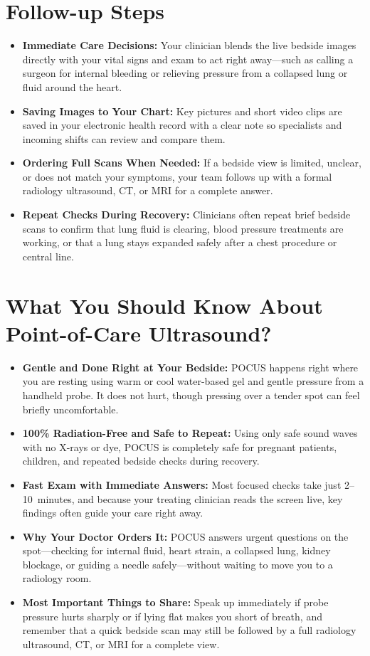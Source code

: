 \section{Follow-up Steps}

\begin{itemize}
    \item \textbf{Immediate Care Decisions:} Your clinician blends the live bedside images directly with your vital signs and exam to act right away---such as calling a surgeon for internal bleeding or relieving pressure from a collapsed lung or fluid around the heart.
    \item \textbf{Saving Images to Your Chart:} Key pictures and short video clips are saved in your electronic health record with a clear note so specialists and incoming shifts can review and compare them.
    \item \textbf{Ordering Full Scans When Needed:} If a bedside view is limited, unclear, or does not match your symptoms, your team follows up with a formal radiology ultrasound, CT, or MRI for a complete answer.
    \item \textbf{Repeat Checks During Recovery:} Clinicians often repeat brief bedside scans to confirm that lung fluid is clearing, blood pressure treatments are working, or that a lung stays expanded safely after a chest procedure or central line.
\end{itemize}

\section{What You Should Know About Point-of-Care Ultrasound?}

\begin{itemize}
    \item \textbf{Gentle and Done Right at Your Bedside:} POCUS happens right where you are resting using warm or cool water-based gel and gentle pressure from a handheld probe. It does not hurt, though pressing over a tender spot can feel briefly uncomfortable.
    \item \textbf{100\% Radiation-Free and Safe to Repeat:} Using only safe sound waves with no X-rays or dye, POCUS is completely safe for pregnant patients, children, and repeated bedside checks during recovery.
    \item \textbf{Fast Exam with Immediate Answers:} Most focused checks take just 2--10~minutes, and because your treating clinician reads the screen live, key findings often guide your care right away.
    \item \textbf{Why Your Doctor Orders It:} POCUS answers urgent questions on the spot---checking for internal fluid, heart strain, a collapsed lung, kidney blockage, or guiding a needle safely---without waiting to move you to a radiology room.
    \item \textbf{Most Important Things to Share:} Speak up immediately if probe pressure hurts sharply or if lying flat makes you short of breath, and remember that a quick bedside scan may still be followed by a full radiology ultrasound, CT, or MRI for a complete view.
\end{itemize}

